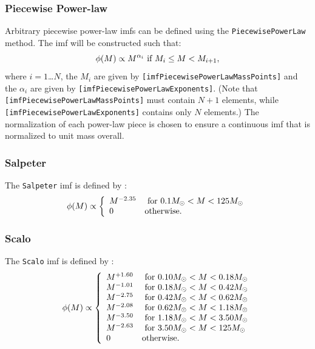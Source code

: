 \subsubsection{Piecewise Power-law}

Arbitrary piecewise power-law {\gls{imf}}s can be defined using the {\tt PiecewisePowerLaw} method. The \gls{imf} will be constructed such that:
\begin{equation}
 \phi(M) \propto M^{\alpha_i} \hbox{ if } M_i \le M < M_{i+1},
\end{equation}
where $i=1$\ldots$N$, the $M_i$ are given by {\tt [imfPiecewisePowerLawMassPoints]} and the $\alpha_i$ are given by {\tt [imfPiecewisePowerLawExponents]}. (Note that {\tt [imfPiecewisePowerLawMassPoints]} must contain $N+1$ elements, while {\tt [imfPiecewisePowerLawExponents]} contains only $N$ elements.) The normalization of each power-law piece is chosen to ensure a continuous \gls{imf} that is normalized to unit mass overall.

\subsubsection{Salpeter}

The {\tt Salpeter} \gls{imf} is defined by \citep{salpeter_luminosity_1955}:
\begin{equation}
 \phi(M) \propto \left\{ \begin{array}{ll} M^{-2.35} & \hbox{ for } 0.1M_\odot < M < 125M_\odot \\ 0 & \hbox {otherwise.} \end{array} \right.
\end{equation}

\subsubsection{Scalo}

The {\tt Scalo} \gls{imf} is defined by \citep{scalo_stellar_1986}:
\begin{equation}
 \phi(M) \propto \left\{ \begin{array}{ll}
 M^{+1.60} & \hbox{ for } 0.10M_\odot < M < 0.18M_\odot \\
 M^{-1.01} & \hbox{ for } 0.18M_\odot < M < 0.42M_\odot \\
 M^{-2.75} & \hbox{ for } 0.42M_\odot < M < 0.62M_\odot \\
 M^{-2.08} & \hbox{ for } 0.62M_\odot < M < 1.18M_\odot \\
 M^{-3.50} & \hbox{ for } 1.18M_\odot < M < 3.50M_\odot \\
 M^{-2.63} & \hbox{ for } 3.50M_\odot < M < 125M_\odot \\
 0 & \hbox {otherwise.} \end{array} \right.
\end{equation}







